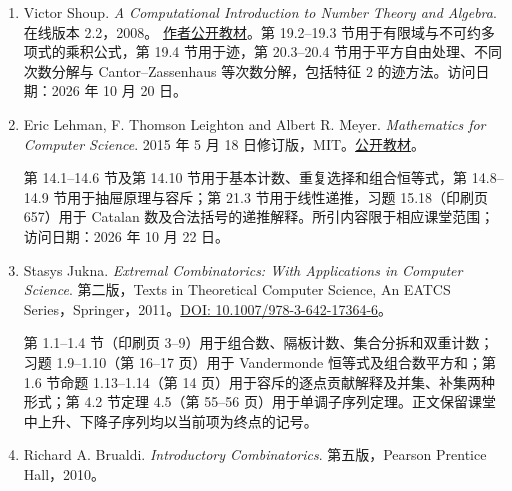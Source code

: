 \documentclass[lang=cn,a4paper,fontset=none,zihao=false,10pt,openany,twoside]{beautybook}
\numberwithin{algorithm}{chapter}
\begin{document}
\begin{enumerate}[(1)]
第 III.3 节用于整环中的分解、理想升链及 PID 到 UFD 的论证；第 III.4 节定理 4.5 与推论 4.6 用于分式域的泛性质；第 V.1 节用于域扩张、最小多项式与塔式公式，第 V.3 节用于分裂域的存在唯一性，第 V.5 节定理 5.1、推论 5.2、命题 5.6 与推论 5.7--5.9 用于素域、有限域的存在唯一性及不可约多项式的存在性。采用课堂的 Euclid 函数约定：在零处取零，在非零处取正整数。

第八章的 Gauss 引理与 Eisenstein 判别法参见第 III 章引理 6.11--6.13 与定理 6.15。第 V 章定理 2.5、命题 2.20、定理 4.12、命题 5.10 及第 9 节和附录分别用于核对固定域对应、对称多项式、素数次数的根置换、有限域的循环 Galois 群、根式扩张和一般方程（命题 9.8）。

\item Victor Shoup. \emph{A Computational Introduction to Number Theory and Algebra}. 在线版本 2.2，2008。
\href{https://shoup.net/ntb/ntb-v2_2.pdf}{作者公开教材}。第 19.2--19.3 节用于有限域与不可约多项式的乘积公式，第 19.4 节用于迹，第 20.3--20.4 节用于平方自由处理、不同次数分解与 Cantor--Zassenhaus 等次数分解，包括特征 $2$ 的迹方法。访问日期：2026 年 10 月 20 日。
\item Eric Lehman, F. Thomson Leighton and Albert R. Meyer. \emph{Mathematics for Computer Science}. 2015 年 5 月 18 日修订版，MIT。\href{https://ocw.mit.edu/courses/6-042j-mathematics-for-computer-science-spring-2015/mit6_042js15_textbook.pdf}{公开教材}。

第 14.1--14.6 节及第 14.10 节用于基本计数、重复选择和组合恒等式，第 14.8--14.9 节用于抽屉原理与容斥；第 21.3 节用于线性递推，习题 15.18（印刷页 657）用于 Catalan 数及合法括号的递推解释。所引内容限于相应课堂范围；访问日期：2026 年 10 月 22 日。
\item Stasys Jukna. \emph{Extremal Combinatorics: With Applications in Computer Science}. 第二版，Texts in Theoretical Computer Science, An EATCS Series，Springer，2011。\href{https://doi.org/10.1007/978-3-642-17364-6}{DOI: 10.1007/978-3-642-17364-6}。

第 1.1--1.4 节（印刷页 3--9）用于组合数、隔板计数、集合分拆和双重计数；习题 1.9--1.10（第 16--17 页）用于 Vandermonde 恒等式及组合数平方和；第 1.6 节命题 1.13--1.14（第 14 页）用于容斥的逐点贡献解释及并集、补集两种形式；第 4.2 节定理 4.5（第 55--56 页）用于单调子序列定理。正文保留课堂中上升、下降子序列均以当前项为终点的记号。

\item Richard A. Brualdi. \emph{Introductory Combinatorics}. 第五版，Pearson Prentice Hall，2010。


\end{enumerate}
\end{document}
